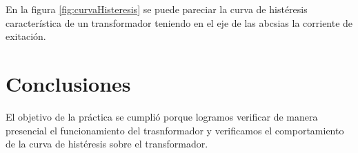 \documentclass[]{article}
\begin{document}
	En la figura \ref{fig:curvaHisteresis} se puede pareciar la curva de histéresis característica de un transformador teniendo en el eje de las abcsias la corriente de exitación.\\
    
	
	\section{Conclusiones}
	
	El objetivo de la práctica se cumplió porque logramos verificar de manera presencial el funcionamiento del trasnformador y verificamos el comportamiento de la curva de histéresis sobre el transformador.\\

	

    


	
	
\end{document}

